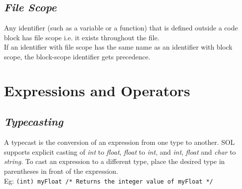 \documentclass[letterpaper,12pt]{article}
\begin{document}
	\subsection{\textit{File Scope}}
	Any identifier (such as a variable or a function) that is defined outside a code block has file scope i.e. it exists throughout the file.\\
	If an identifier with file scope has the same name as an identifier with block scope, the block-scope identifier gets precedence.

\section{Expressions and Operators}
	\subsection{\textit{Typecasting}}
	A typecast is the conversion of an expression from one type to another. SOL supports explicit casting of \textit{int} to \textit{float}, \textit{float} to \textit{int}, and \textit{int}, \textit{float} and \textit{char} to \textit{string}. To cast an expression to a different type, place the desired type in parentheses in front of the expression. \\
	Eg: \texttt{(int) myFloat /* Returns the integer value of myFloat */}
	
\end{document}
